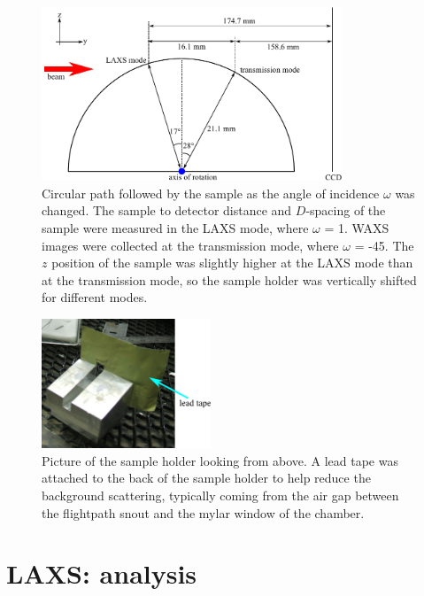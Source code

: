 \begin{figure}[htbp]
  \centering
  \includegraphics[width=0.8\textwidth]{figures/ripple/MMs/transmission/sgeometry}
  \caption{Circular path followed by the sample 
  as the angle of incidence $\omega$ was changed. The sample to detector distance and 
  $D$-spacing of the sample were measured in the LAXS mode, where $\omega$ = 1\textdegree. WAXS images
  were collected at the transmission mode, where $\omega$ = -45\textdegree. 
  The $z$ position of the sample was
  slightly higher at the LAXS mode than at the transmission mode, so the 
  sample holder was vertically shifted for different modes.}
  \label{fig:sgeometry}
\end{figure}

\begin{figure}[htbp]
  \centering
  \includegraphics[width=0.45\textwidth]{figures/ripple/MMs/transmission/sample_holder1}
  \caption{Picture of the sample holder looking from above. A lead tape was
  attached to the back of the sample holder to help reduce the background 
  scattering, typically coming from the air gap between the flightpath snout
  and the mylar window of the chamber.}
  \label{fig:holder_picture}
\end{figure}

\newpage
\section{LAXS: analysis}
